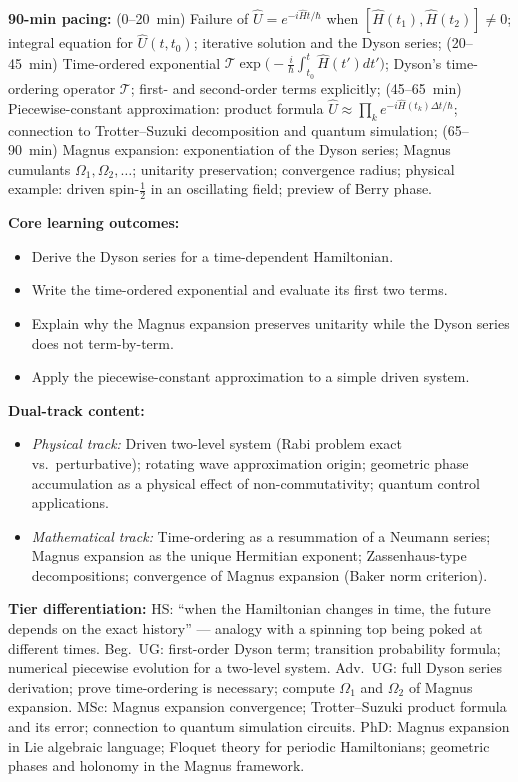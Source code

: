 \documentclass[11pt,a4paper]{article}
\begin{document}
\medskip
\begin{tcolorbox}[modulebox, title={Module~I.3 / L06: Time Evolution II --- Time-Dependent and Non-Commuting Hamiltonians}]
\textbf{90-min pacing:} (0--20~min) Failure of $\hat{U}=e^{-i\hat{H}t/\hbar}$ when
$[\hat{H}(t_1),\hat{H}(t_2)]\neq 0$; integral equation for $\hat{U}(t,t_0)$;
iterative solution and the Dyson series;
(20--45~min) Time-ordered exponential
$\mathcal{T}\exp\!\bigl(-\tfrac{i}{\hbar}\int_{t_0}^{t}\hat{H}(t')dt'\bigr)$;
Dyson's time-ordering operator $\mathcal{T}$; first- and second-order terms explicitly;
(45--65~min) Piecewise-constant approximation: product formula
$\hat{U}\approx\prod_k e^{-i\hat{H}(t_k)\Delta t/\hbar}$;
connection to Trotter--Suzuki decomposition and quantum simulation;
(65--90~min) Magnus expansion: exponentiation of the Dyson series;
Magnus cumulants $\Omega_1,\Omega_2,\ldots$; unitarity preservation;
convergence radius; physical example: driven spin-$\tfrac{1}{2}$ in an
oscillating field; preview of Berry phase.

\medskip\textbf{Core learning outcomes:}
\begin{itemize}[leftmargin=1.4em,topsep=2pt,itemsep=1pt]
  \item Derive the Dyson series for a time-dependent Hamiltonian.
  \item Write the time-ordered exponential and evaluate its first two terms.
  \item Explain why the Magnus expansion preserves unitarity while the Dyson series does not term-by-term.
  \item Apply the piecewise-constant approximation to a simple driven system.
\end{itemize}

\medskip\textbf{Dual-track content:}
\begin{itemize}[leftmargin=1.4em,topsep=2pt,itemsep=1pt]
  \item \textit{Physical track:} Driven two-level system (Rabi problem exact vs.\ perturbative);
    rotating wave approximation origin; geometric phase accumulation as a physical effect
    of non-commutativity; quantum control applications.
  \item \textit{Mathematical track:} Time-ordering as a resummation of a Neumann series;
    Magnus expansion as the unique Hermitian exponent; Zassenhaus-type decompositions;
    convergence of Magnus expansion (Baker norm criterion).
\end{itemize}

\medskip\textbf{Tier differentiation:}
HS: ``when the Hamiltonian changes in time, the future depends on the exact history''
--- analogy with a spinning top being poked at different times.
Beg.\ UG: first-order Dyson term; transition probability formula;
numerical piecewise evolution for a two-level system.
Adv.\ UG: full Dyson series derivation; prove time-ordering is necessary;
compute $\Omega_1$ and $\Omega_2$ of Magnus expansion.
MSc: Magnus expansion convergence; Trotter--Suzuki product formula and its error;
connection to quantum simulation circuits.
PhD: Magnus expansion in Lie algebraic language; Floquet theory for periodic
Hamiltonians; geometric phases and holonomy in the Magnus framework.


\end{tcolorbox}
\end{document}
